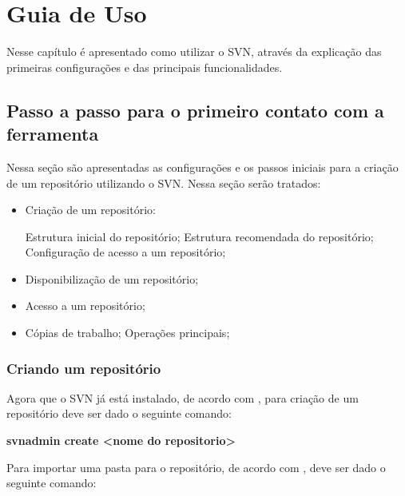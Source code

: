 \chapter[Guia de Uso]{Guia de Uso}

Nesse capítulo é apresentado como utilizar o SVN, através da explicação das primeiras configurações e das principais funcionalidades.

\section{Passo a passo para o primeiro contato com a ferramenta}

Nessa seção são apresentadas as configurações e os passos iniciais para a criação de um repositório utilizando o SVN. Nessa seção serão tratados:

\begin{itemize}

\item Criação de um repositório:
  
  \subitem Estrutura inicial do repositório;
  \subitem Estrutura recomendada do repositório;
  \subitem Configuração de acesso a um repositório;

\item Disponibilização de um repositório;

\item Acesso a um repositório;

\item Cópias de trabalho;
    \subitem Operações principais;

\end{itemize}

\subsection{Criando um repositório}

Agora que o SVN já está instalado, de acordo com , para criação de um repositório deve ser dado o seguinte comando:

\begin{centering}

\colorbox{PineGreen}{
\begin{minipage}{250px}
  \textbf{svnadmin create <nome do repositorio>}

\end{minipage}
}
\end{centering}

Para importar uma pasta para o repositório, de acordo com , deve ser dado o seguinte comando:



